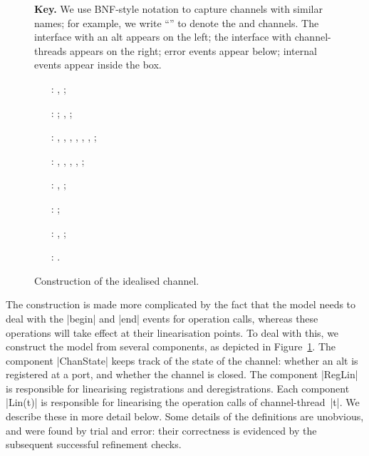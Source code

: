 \begin{figure}

\uncspMid
\textbf{Key.}  We use BNF-style notation to capture
channels with similar names; for example, we write
``\m{}'' to denote the  and
 channels.  The interface with an alt appears on the left; the
interface with channel-threads appears on the right; error events appear
below; internal events appear inside the box. 

\raggedright
%
\begin{itemize}
\item[\inCircle{1}:]  \m{}\m{}, 
  \m{}\m{};

\item[\inCircle{2}:] \m{};
  \m{}, ;

\item[\inCircle{3}:] , ,
  , , , ,
  ;

\item[\inCircle{4}:] \m{},
  \m{}, \m{},
  \m{}, \m{};

\item[\inCircle{5}:] \m{},
  \m{};

\item[\inCircle{6}:] \m{};

\item[\inCircle{7}:] ,
  \m{};

\item[\inCircle{8}:] \m{}.
\end{itemize}
\caption{Construction of the idealised channel.  \label{fig:idealised-chan}}
\end{figure}

\cspMid


The construction is made more complicated by the fact that the model needs to
deal with the |begin| and |end| events for operation calls, whereas these
operations will take effect at their linearisation points.  To deal with this,
we construct the model from several components, as depicted in
Figure~\ref{fig:idealised-chan}.  The component |ChanState| keeps track of the
state of the channel: whether an alt is registered at a port, and whether the
channel is closed.  The component |RegLin| is responsible for linearising
registrations and deregistrations.  Each component |Lin(t)| is responsible for
linearising the operation calls of channel-thread~|t|.  We describe these in
more detail below.  Some details of the definitions are unobvious, and were
found by trial and error: their correctness is evidenced by the subsequent
successful refinement checks.

